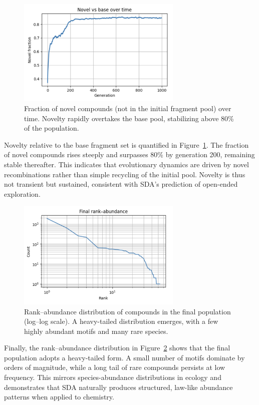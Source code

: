 \documentclass[life,article,submit,pdftex,moreauthors]{Definitions/mdpi}
\begin{document}
\begin{figure}[H]
    \centering
    \includegraphics[width=0.7\textwidth]{SDA-chem-novel.png}
    \caption{Fraction of novel compounds (not in the initial fragment pool) over time. Novelty rapidly overtakes the base pool, stabilizing above 80\% of the population.}
    \label{fig:chem-novel}
\end{figure}

Novelty relative to the base fragment set is quantified in Figure~\ref{fig:chem-novel}. The fraction of novel compounds rises steeply and surpasses 80\% by generation 200, remaining stable thereafter. This indicates that evolutionary dynamics are driven by novel recombinations rather than simple recycling of the initial pool. Novelty is thus not transient but sustained, consistent with SDA’s prediction of open-ended exploration.  

\begin{figure}[H]
    \centering
    \includegraphics[width=0.7\textwidth]{SDA-chem-rank.png}
    \caption{Rank–abundance distribution of compounds in the final population (log–log scale). A heavy-tailed distribution emerges, with a few highly abundant motifs and many rare species.}
    \label{fig:chem-rank}
\end{figure}

Finally, the rank–abundance distribution in Figure~\ref{fig:chem-rank} shows that the final population adopts a heavy-tailed form. A small number of motifs dominate by orders of magnitude, while a long tail of rare compounds persists at low frequency. This mirrors species-abundance distributions in ecology and demonstrates that SDA naturally produces structured, law-like abundance patterns when applied to chemistry.  
\end{document}
